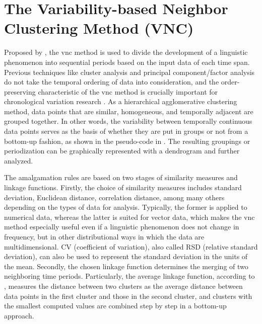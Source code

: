 \section{The Variability-based Neighbor Clustering Method (VNC)}
Proposed by \textcite{gries2012variability}, the \gls{vnc} method is used to divide the development of a linguistic phenomenon into sequential periods based on the input data of each time span. Previous techniques like cluster analysis and principal component/factor analysis do not take the temporal ordering of data into consideration, and the order-preserving characteristic of the \gls{vnc} method is crucially important for chronological variation research \parencite{moisl2015cluster}. As a hierarchical agglomerative clustering method, data points that are similar, homogeneous, and temporally adjacent are grouped together. In other words, the variability between temporally continuous data points serves as the basis of whether they are put in groups or not from a bottom-up fashion, as shown in the pseudo-code in . The resulting groupings or periodization can be graphically represented with a dendrogram and further analyzed.

The amalgamation rules are based on two stages of similarity measures and linkage functions. Firstly, the choice of similarity measures includes standard deviation, Euclidean distance, correlation distance, among many others depending on the types of data for analysis. Typically, the former is applied to numerical data, whereas the latter is suited for vector data, which makes the \gls{vnc} method especially useful even if a linguistic phenomenon does not change in frequency, but in other distributional ways in which the data are multidimensional. CV (coefficient of variation), also called RSD (relative standard deviation), can also be used to represent the standard deviation in the units of the mean. Secondly, the chosen linkage function determines the merging of two neighboring time periods. Particularly, the average linkage function, according to , measures the distance between two clusters as the average distance between data points in the first cluster and those in the second cluster, and clusters with the smallest computed values are combined step by step in a bottom-up approach.


